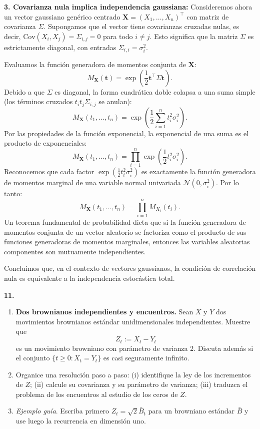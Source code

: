\documentclass[11pt, letterpaper]{article}
\begin{document}
\begin{solucion}
    \textbf{3. Covarianza nula implica independencia gaussiana:}
    Consideremos ahora un vector gaussiano genérico centrado $\mathbf{X} = (X_1, \dots, X_n)^\top$ con matriz de covarianza $\Sigma$. 
    Supongamos que el vector tiene covarianzas cruzadas nulas, es decir, $\text{Cov}(X_i, X_j) = \Sigma_{i,j} = 0$ para todo $i \neq j$. 
    Esto significa que la matriz $\Sigma$ es estrictamente diagonal, con entradas $\Sigma_{i,i} = \sigma_i^2$.
    
    Evaluamos la función generadora de momentos conjunta de $\mathbf{X}$:
    $$M_{\mathbf{X}}(\mathbf{t}) = \exp\left( \frac{1}{2} \mathbf{t}^\top \Sigma \mathbf{t} \right).$$
    Debido a que $\Sigma$ es diagonal, la forma cuadrática doble colapsa a una suma simple (los términos cruzados $t_i t_j \Sigma_{i,j}$ se anulan):
    $$M_{\mathbf{X}}(t_1, \dots, t_n) = \exp\left( \frac{1}{2} \sum_{i=1}^n t_i^2 \sigma_i^2 \right).$$
    Por las propiedades de la función exponencial, la exponencial de una suma es el producto de exponenciales:
    $$M_{\mathbf{X}}(t_1, \dots, t_n) = \prod_{i=1}^n \exp\left( \frac{1}{2} t_i^2 \sigma_i^2 \right).$$
    Reconocemos que cada factor $\exp(\frac{1}{2} t_i^2 \sigma_i^2)$ es exactamente la función generadora de momentos marginal de una variable normal univariada $\mathcal{N}(0, \sigma_i^2)$. Por lo tanto:
    $$M_{\mathbf{X}}(t_1, \dots, t_n) = \prod_{i=1}^n M_{X_i}(t_i).$$
    Un teorema fundamental de probabilidad dicta que si la función generadora de momentos conjunta de un vector aleatorio se factoriza como el producto de sus funciones generadoras de momentos marginales, entonces las variables aleatorias componentes son mutuamente independientes. 
    
    Concluimos que, en el contexto de vectores gaussianos, la condición de correlación nula es equivalente a la independencia estocástica total.
\end{solucion}

\newpage

\begin{ejercicio}
    \textbf{11.} 
    \begin{enumerate}
        \item \textbf{Dos brownianos independientes y encuentros.} Sean $X$ y $Y$ dos movimientos brownianos estándar unidimensionales independientes. Muestre que 
        \[ Z_t := X_t - Y_t \]
        es un movimiento browniano con parámetro de varianza 2. Discuta además si el conjunto $\{t \ge 0 : X_t = Y_t\}$ es casi seguramente infinito.
        \item Organice una resolución paso a paso: (i) identifique la ley de los incrementos de $Z$; (ii) calcule su covarianza y su parámetro de varianza; (iii) traduzca el problema de los encuentros al estudio de los ceros de $Z$.
        \item \textit{Ejemplo guía}. Escriba primero $Z_t = \sqrt{2}\bar{B}_t$ para un browniano estándar $\bar{B}$ y use luego la recurrencia en dimensión uno.
    \end{enumerate}
\end{ejercicio}
\end{document}
